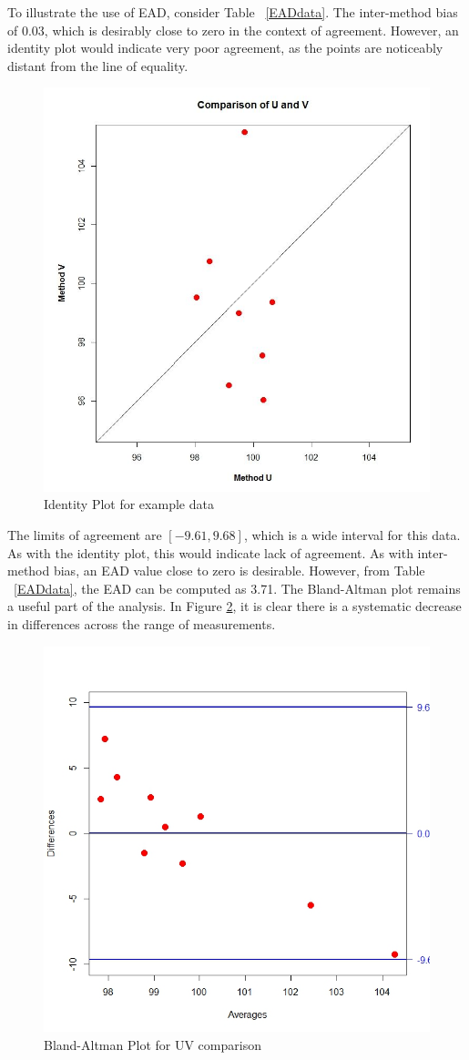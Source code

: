 \documentclass[12pt, a4paper]{report}
\theoremstyle{plain}
\theoremstyle{definition}
\theoremstyle{remark}
\begin{document}
	To illustrate the use of EAD, consider Table ~\ref{EADdata}. The inter-method bias of 0.03, which is desirably close to zero in the context of agreement. However, an identity plot would indicate very poor agreement, as the points are noticeably distant from the line of equality.
	\begin{figure}
		\centering
		\includegraphics[width=0.5\linewidth]{EAD-UV}
		\caption{Identity Plot for example data}
		\label{fig:EADidentity}
	\end{figure}
	
	The limits of agreement are $[-9.61, 9.68]$, which is a wide interval for this data. As with the identity plot, this would indicate lack of agreement. As with inter-method bias, an EAD value close to zero is desirable. However, from Table ~\ref{EADdata}, the EAD can be computed as 3.71. The Bland-Altman plot remains a useful part of the analysis. In Figure \ref{fig:EAD1}, it is clear there is a systematic decrease in differences across the range of measurements.
	\begin{figure}[h!]
		\centering
		\includegraphics[width=0.55\linewidth]{images/EAD1}
		\caption{Bland-Altman Plot for UV comparison}
		\label{fig:EAD1}
	\end{figure}
	
\end{document}
